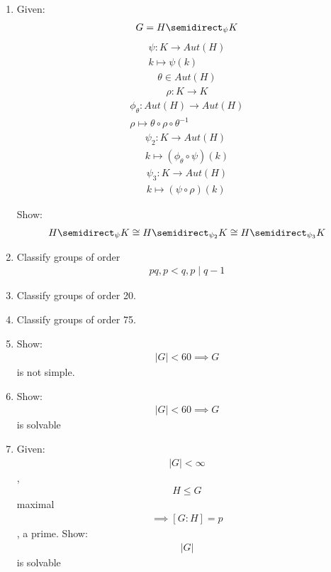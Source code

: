 \begin{enumerate}
\def\labelenumi{\arabic{enumi}.}
\item
  Given: \begin{align*}G = H \semidirect_\psi K\end{align*}
  \begin{align*}\psi: K \rightarrow Aut(H) \\ k \mapsto \psi(k)\end{align*}
  \begin{align*}\theta \in Aut(H)\end{align*}
  \begin{align*}\rho: K \rightarrow K\end{align*}
  \begin{align*}\phi_\theta: Aut(H) \rightarrow Aut(H) \\ \rho \mapsto \theta \circ \rho \circ \theta^{-1}\end{align*}
  \begin{align*}\psi_2: K \rightarrow Aut(H) \\ k \mapsto (\phi_\theta \circ \psi)(k)\end{align*}
  \begin{align*}\psi_3: K \rightarrow Aut(H) \\ k \mapsto (\psi \circ \rho)(k)\end{align*}

  Show:
  \begin{align*}H \semidirect_\psi K \cong H \semidirect_{\psi_2} K \cong H \semidirect_{\psi_3} K\end{align*}
\item
  Classify groups of order
  \begin{align*}pq, p < q, p \mid q-1\end{align*}
\item
  Classify groups of order 20.
\item
  Classify groups of order 75.
\item
  Show: \begin{align*}|G| < 60 \implies G\end{align*} is not simple.
\item
  Show: \begin{align*}|G| < 60 \implies G\end{align*} is solvable
\item
  Given: \begin{align*}|G| < \infty\end{align*},
  \begin{align*}H \leq G\end{align*} maximal
  \begin{align*}\implies [G:H] = p\end{align*}, a prime. Show:
  \begin{align*}|G|\end{align*} is solvable


\end{enumerate}
